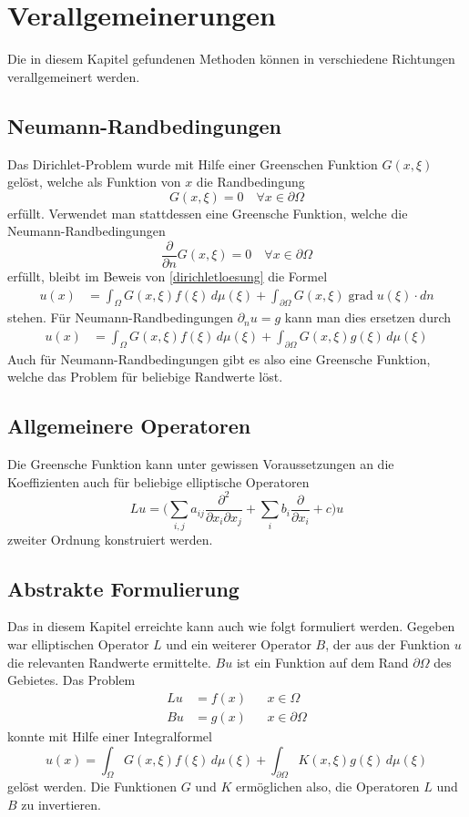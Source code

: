 \section{Verallgemeinerungen}
Die in diesem Kapitel gefundenen Methoden können in verschiedene Richtungen
verallgemeinert werden.
\subsection{Neumann-Randbedingungen}
Das Dirichlet-Problem wurde mit Hilfe einer Greenschen Funktion $G(x,\xi)$
gelöst, welche als Funktion von $x$ die Randbedingung
\[
G(x,\xi)=0\quad\forall x\in\partial\Omega
\]
erfüllt.
Verwendet man stattdessen eine Greensche Funktion, welche die
Neumann-Randbedingungen
\[
\frac{\partial}{\partial n}G(x,\xi)=0\quad\forall x\in\partial\Omega
\]
erfüllt, bleibt im Beweis von \ref{dirichletloesung}
die Formel
\begin{align*}
u(x)&=\int_{\Omega}G(x,\xi)f(\xi)\,d\mu(\xi)+\int_{\partial\Omega}G(x,\xi)\operatorname{grad}u(\xi)\cdot dn
\end{align*}
stehen. Für Neumann-Randbedingungen $\partial_n u=g$ kann man dies ersetzen
durch
\begin{align*}
u(x)&=\int_{\Omega}G(x,\xi)f(\xi)\,d\mu(\xi)+\int_{\partial\Omega}G(x,\xi)g(\xi)\,d\mu(\xi)
\end{align*}
Auch für Neumann-Randbedingungen gibt es also eine Greensche Funktion, welche
das Problem für beliebige Randwerte löst.

\subsection{Allgemeinere Operatoren}
Die Greensche Funktion kann unter gewissen Voraussetzungen
an die Koeffizienten auch für beliebige elliptische Operatoren
\[
Lu=\biggl(\sum_{i,j}a_{ij}\frac{\partial^2}{\partial x_i\partial x_j}
+\sum_ib_i\frac{\partial}{\partial x_i} +c\biggr)u
\]
zweiter Ordnung konstruiert werden.

\subsection{Abstrakte Formulierung}
Das in diesem Kapitel erreichte kann auch wie folgt formuliert werden.
Gegeben war elliptischen Operator $L$ und ein weiterer Operator $B$,
der aus der Funktion $u$ die relevanten Randwerte ermittelte. $Bu$
ist ein Funktion auf dem Rand $\partial \Omega$ des Gebietes. 
Das Problem
\begin{align*}
Lu&=f(x)&&x\in\Omega
\\
Bu&=g(x)&&x\in\partial\Omega
\end{align*}
konnte mit Hilfe einer Integralformel
\[
u(x)=\int_\Omega G(x,\xi)f(\xi)\,d\mu(\xi)+\int_{\partial \Omega}K(x,\xi)g(\xi)\,d\mu(\xi)
\]
gelöst werden.
Die Funktionen $G$ und $K$ ermöglichen also, die Operatoren $L$ und $B$
zu invertieren.

